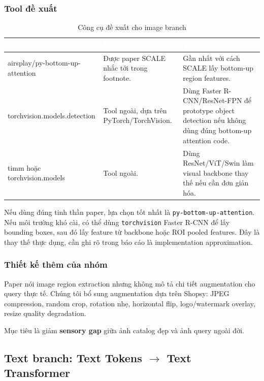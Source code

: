 \documentclass[12pt,a4paper]{article}
\begin{document}
\subsubsection{Tool đề xuất}
\begin{table}[htbp]
\centering
\begin{tabularx}{\linewidth}{@{}L{4cm}L{3.4cm}Y@{}}
\toprule
{}
\textcolor{white}{\textbf{Tool}} & \textcolor{white}{\textbf{Nguồn}} & \textcolor{white}{\textbf{Vai trò}} \\
\midrule
\textsf{\small airsplay/\allowbreak py-bottom-up-\allowbreak attention} & Được paper SCALE nhắc tới trong footnote. & Gần nhất với cách SCALE lấy bottom-up region features. \\
\textsf{\small torchvision.models.\allowbreak detection} & Tool ngoài, dựa trên PyTorch/TorchVision. & Dùng Faster R-CNN/ResNet-FPN để prototype object detection nếu không dùng đúng bottom-up attention code. \\
\textsf{\small timm} hoặc \textsf{\small torchvision.models} & Tool ngoài. & Dùng ResNet/ViT/Swin làm visual backbone thay thế nếu cần đơn giản hóa. \\
\bottomrule
\end{tabularx}
\caption{Công cụ đề xuất cho image branch}
\end{table}

Nếu dùng đúng tinh thần paper, lựa chọn tốt nhất là \texttt{py-bottom-up-attention}. Nếu môi trường khó cài, có thể dùng \texttt{torchvision} Faster R-CNN để lấy bounding boxes, sau đó lấy feature từ backbone hoặc ROI pooled features. Đây là thay thế thực dụng, cần ghi rõ trong báo cáo là implementation approximation.

\subsubsection{Thiết kế thêm của nhóm}
Paper nói image region extraction nhưng không mô tả chi tiết augmentation cho query thực tế. Chúng tôi bổ sung augmentation dựa trên Shopsy: JPEG compression, random crop, rotation nhẹ, horizontal flip, logo/watermark overlay, resize quality degradation.

Mục tiêu là giảm \textbf{sensory gap} giữa ảnh catalog đẹp và ảnh query ngoài đời.

\subsection{Text branch: Text Tokens $\to$ Text Transformer}
\end{document}
